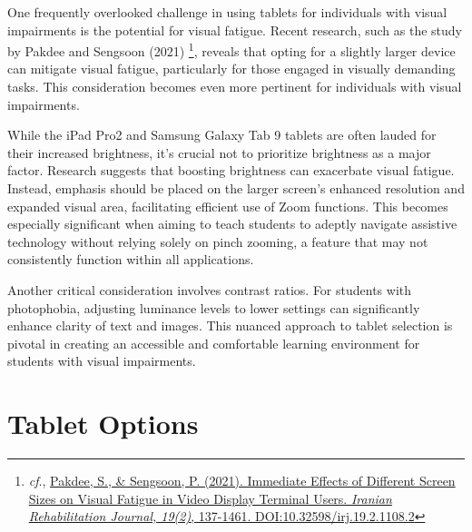 \documentclass[14pt,letterpaper,twoside]{extreport}
\begin{document}
One frequently overlooked challenge in using tablets for individuals with visual impairments is the potential for visual fatigue. Recent research, such as the study by Pakdee and Sengsoon (2021) \footnote{\textit{cf}., \href{https://www.researchgate.net/publication/352764109_Immediate_Effects_of_Different_Screen_Sizes_on_Visual_Fatigue_in_Video_Display_Terminal_Users}{Pakdee, S., \& Sengsoon, P. (2021). Immediate Effects of Different Screen Sizes on Visual Fatigue in Video Display Terminal Users. \textit{Iranian Rehabilitation Journal, 19(2)}, 137-1461. DOI:10.32598/irj.19.2.1108.2}}, reveals that opting for a slightly larger device can mitigate visual fatigue, particularly for those engaged in visually demanding tasks. This consideration becomes even more pertinent for individuals with visual impairments.

While the iPad Pro2 and Samsung Galaxy Tab 9 tablets are often lauded for their increased brightness, it's crucial not to prioritize brightness as a major factor. Research suggests that boosting brightness can exacerbate visual fatigue. Instead, emphasis should be placed on the larger screen's enhanced resolution and expanded visual area, facilitating efficient use of Zoom functions. This becomes especially significant when aiming to teach students to adeptly navigate assistive technology without relying solely on pinch zooming, a feature that may not consistently function within all applications.

Another critical consideration involves contrast ratios. For students with photophobia, adjusting luminance levels to lower settings can significantly enhance clarity of text and images. This nuanced approach to tablet selection is pivotal in creating an accessible and comfortable learning environment for students with visual impairments.

\hypertarget{tablet-options}{%
	\section{Tablet Options}\label{tablet-options}}
\end{document}
